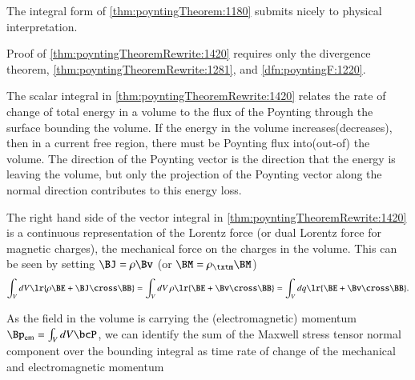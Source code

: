 The integral form of \cref{thm:poyntingTheorem:1180} submits nicely to physical interpretation.


Proof of \cref{thm:poyntingTheoremRewrite:1420} requires only the divergence theorem, \cref{thm:poyntingTheoremRewrite:1281}, and
\cref{dfn:poyntingF:1220}.

The scalar integral in \cref{thm:poyntingTheoremRewrite:1420}
relates the rate of change of total energy in a volume to the flux of the Poynting through the surface bounding the volume.
If the energy in the volume increases(decreases), then in a current free region, there must be Poynting flux into(out-of) the volume.
The direction of the Poynting vector is the direction that the energy is leaving the volume, but only the projection of the Poynting vector along the normal direction contributes to this energy loss.

The right hand side of the vector integral in \cref{thm:poyntingTheoremRewrite:1420} is a continuous representation of the Lorentz force
(or dual Lorentz force for magnetic charges),
the mechanical force on the charges in the volume.  This can be seen by setting \( \BJ = \rho \Bv \) (or \( \BM = \rho_\txtm \BM \))
\begin{dmath}\label{eqn:poyntingTheoremRewrite:1420}
\int_V dV \lr{ \rho \BE + \BJ \cross \BB }
=
\int_V dV\, \rho \lr{ \BE + \Bv \cross \BB }
=
\int_V dq \lr{ \BE + \Bv \cross \BB }.
\end{dmath}

As the field in the volume is carrying the (electromagnetic) momentum \( \Bp_{\textrm{em}} = \int_V dV \bcP \), we can identify the sum of the Maxwell stress tensor normal component over the bounding integral as time rate of change of the mechanical and electromagnetic momentum

